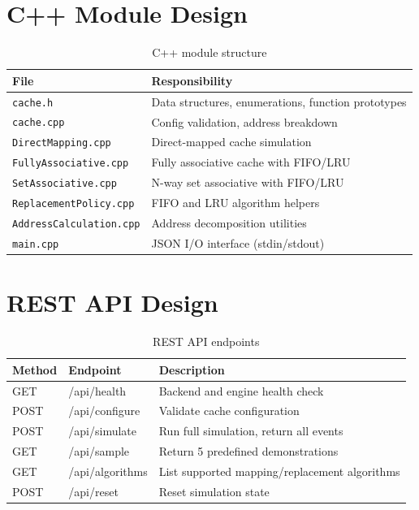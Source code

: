 \documentclass[12pt,a4paper]{report}
\begin{document}
\section{C++ Module Design}
\begin{table}[H]
\centering
\begin{tabular}{ll}
\toprule
\textbf{File} & \textbf{Responsibility} \\
\midrule
\texttt{cache.h}              & Data structures, enumerations, function prototypes \\
\texttt{cache.cpp}            & Config validation, address breakdown \\
\texttt{DirectMapping.cpp}    & Direct-mapped cache simulation \\
\texttt{FullyAssociative.cpp} & Fully associative cache with FIFO/LRU \\
\texttt{SetAssociative.cpp}   & N-way set associative with FIFO/LRU \\
\texttt{ReplacementPolicy.cpp}& FIFO and LRU algorithm helpers \\
\texttt{AddressCalculation.cpp}& Address decomposition utilities \\
\texttt{main.cpp}             & JSON I/O interface (stdin/stdout) \\
\bottomrule
\end{tabular}
\caption{C++ module structure}
\end{table}

\section{REST API Design}
\begin{table}[H]
\centering
\begin{tabular}{lll}
\toprule
\textbf{Method} & \textbf{Endpoint} & \textbf{Description} \\
\midrule
GET  & /api/health      & Backend and engine health check \\
POST & /api/configure   & Validate cache configuration \\
POST & /api/simulate    & Run full simulation, return all events \\
GET  & /api/sample      & Return 5 predefined demonstrations \\
GET  & /api/algorithms  & List supported mapping/replacement algorithms \\
POST & /api/reset       & Reset simulation state \\
\bottomrule
\end{tabular}
\caption{REST API endpoints}
\end{table}
\end{document}
